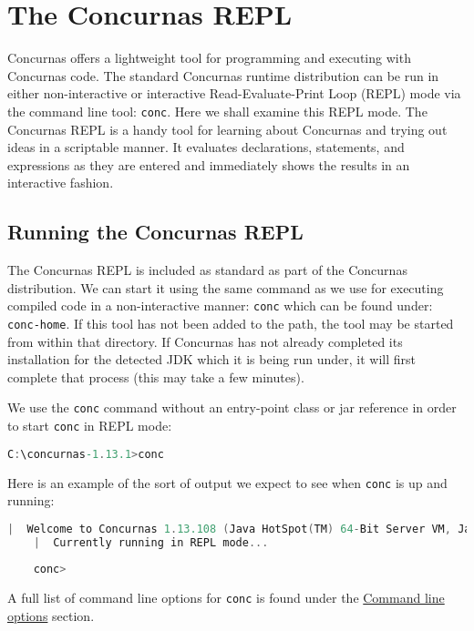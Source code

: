 \documentclass[conc-doc]{subfiles}
\begin{document}
	\chapter[The Concurnas REPL]{The Concurnas REPL}
	\label{ch:repl}
	
	Concurnas offers a lightweight tool for programming and executing with Concurnas code. The standard Concurnas runtime distribution can be run in either non-interactive or interactive Read-Evaluate-Print Loop (REPL) mode via the command line tool: \lstinline{conc}. Here we shall examine this REPL mode. The Concurnas REPL is a handy tool for learning about Concurnas and trying out ideas in a scriptable manner. It evaluates declarations, statements, and expressions as they are entered and immediately shows the results in an interactive fashion.	
	
	\section{Running the Concurnas REPL}
	The Concurnas REPL is included as standard as part of the Concurnas distribution. We can start it using the same command as we use for executing compiled code in a non-interactive manner: \lstinline{conc} which can be found under: \lstinline{conc-home}. If this tool has not been added to the path, the tool may be started from within that directory. If Concurnas has not already completed its installation for the detected JDK which it is being run under, it will first complete that process (this may take a few minutes).
	
	We use the \lstinline{conc} command without an entry-point class or jar reference in order to start \lstinline{conc} in REPL mode:
	
	\begin{lstlisting}[language=C]
	C:\concurnas-1.13.1>conc
	\end{lstlisting}
	
	Here is an example of the sort of output we expect to see when \lstinline{conc} is up and running:
	
	\begin{lstlisting}[language=C]
	|  Welcome to Concurnas 1.13.108 (Java HotSpot(TM) 64-Bit Server VM, Java 11.0.5).
	|  Currently running in REPL mode...
	
	conc> 
	\end{lstlisting}
	
	A full list of command line options for \lstinline{conc} is found under the \hyperref[sec:cmdlineparams]{Command line options} section.
	
\end{document}
